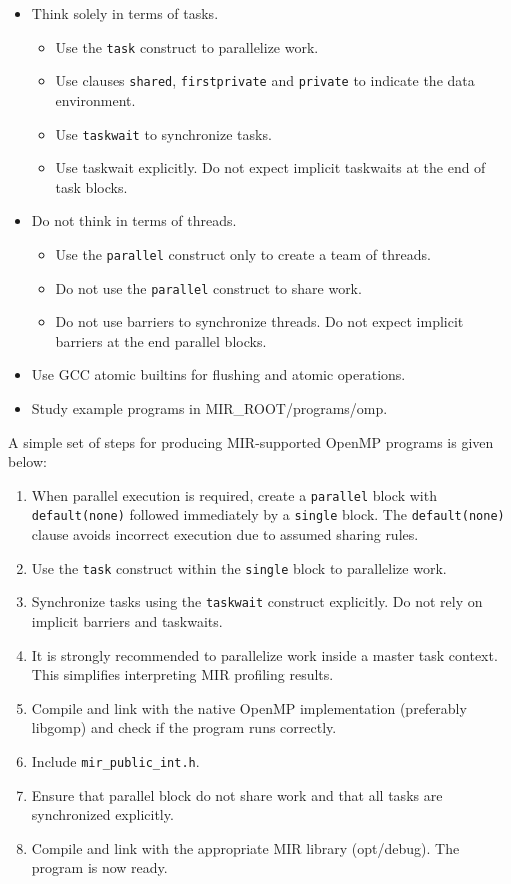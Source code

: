 \documentclass[11pt,a4paper]{article}
\begin{document}
\begin{itemize}
    \item Think solely in terms of tasks.
    \begin{itemize}
        \item Use the \texttt{task} construct to parallelize work.
        \item Use clauses \texttt{shared}, \texttt{firstprivate} and \texttt{private} to indicate the data environment.
        \item Use \texttt{taskwait} to synchronize tasks.
        \item Use taskwait explicitly. Do not expect implicit taskwaits at the end of task blocks.
    \end{itemize}
    \item Do not think in terms of threads.
    \begin{itemize}
        \item Use the \texttt{parallel} construct only to create a team of threads.
        \item Do not use the \texttt{parallel} construct to share work.
        \item Do not use barriers to synchronize threads. Do not expect implicit barriers at the end parallel blocks.
    \end{itemize}
    \item Use GCC atomic builtins for flushing and atomic operations.
    \item Study example programs in MIR\_ROOT/programs/omp.
\end{itemize}

A simple set of steps for producing MIR-supported OpenMP programs is given below:

\begin{enumerate}
\item When parallel execution is required, create a \texttt{parallel}  block with \texttt{default(none)} followed immediately by a \texttt{single} block. The \texttt{default(none)} clause avoids incorrect execution due to assumed sharing rules.
\item Use the \texttt{task} construct within the \texttt{single} block to parallelize work.
\item Synchronize tasks using the \texttt{taskwait} construct explicitly. Do not rely on implicit barriers and taskwaits.
\item It is strongly recommended to parallelize work inside a master task context. This simplifies interpreting MIR profiling results.
\item Compile and link with the native OpenMP implementation (preferably libgomp) and check if the program runs correctly.
\item Include \texttt{mir\_public\_int.h}.
\item Ensure that parallel block do not share work and that all tasks are synchronized explicitly.
\item Compile and link with the appropriate MIR library (opt/debug). The program is now ready.
\end{enumerate}
\end{document}
